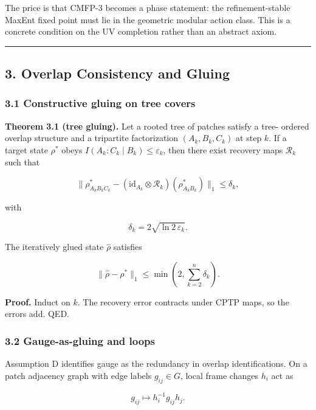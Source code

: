 \documentclass[
]{article}
\begin{document}
The price is that CMFP-3 becomes a phase statement: the
refinement-stable MaxEnt fixed point must lie in the geometric modular
action class. This is a concrete condition on the UV completion rather
than an abstract axiom.

\begin{center}\rule{0.5\linewidth}{0.5pt}\end{center}

\subsection{3. Overlap Consistency and
Gluing}\label{overlap-consistency-and-gluing}

\subsubsection{3.1 Constructive gluing on tree
covers}\label{constructive-gluing-on-tree-covers}

\textbf{Theorem 3.1 (tree gluing).} Let a rooted tree of patches satisfy
a tree- ordered overlap structure and a tripartite factorization
\((A_k, B_k, C_k)\) at step \(k\). If a target state \(\rho^{\ast}\)
obeys \(I(A_k:C_k \mid B_k) \le \varepsilon_k\), then there exist
recovery maps \(\mathcal{R}_k\) such that

\[
\| \rho^{\ast}_{A_k B_k C_k} - (\mathrm{id}_{A_k} \otimes \mathcal{R}_k)(\rho^{\ast}_{A_k B_k}) \|_1
\le \delta_k,
\]

with

\[
\delta_k = 2 \sqrt{\ln 2\, \varepsilon_k}.
\]

The iteratively glued state \(\hat{\rho}\) satisfies

\[
\| \hat{\rho} - \rho^{\ast} \|_1 \le \min\left(2, \sum_{k=2}^n \delta_k\right).
\]

\textbf{Proof.} Induct on \(k\). The recovery error contracts under CPTP
maps, so the errors add. QED.

\subsubsection{3.2 Gauge-as-gluing and
loops}\label{gauge-as-gluing-and-loops}

Assumption D identifies gauge as the redundancy in overlap
identifications. On a patch adjacency graph with edge labels
\(g_{ij} \in G\), local frame changes \(h_i\) act as

\[
 g_{ij} \mapsto h_i^{-1} g_{ij} h_j.
\]
\end{document}
